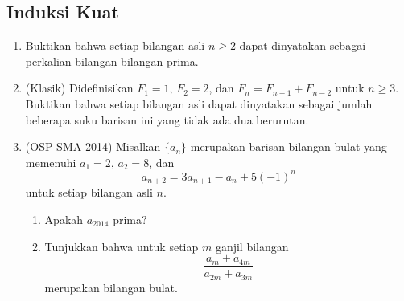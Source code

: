 \documentclass[12pt]{scrartcl}
\begin{document}
\subsection{Induksi Kuat}
\begin{enumerate}[resume]

	\item Buktikan bahwa setiap bilangan asli $n \ge 2$ dapat dinyatakan
	sebagai perkalian bilangan-bilangan prima.

	\item (Klasik)
	Didefinisikan $F_1 = 1$, $F_2 = 2$, dan $F_n = F_{n-1} + F_{n-2}$
	untuk $n \ge 3$.
	Buktikan bahwa setiap bilangan asli dapat dinyatakan sebagai jumlah
	beberapa suku barisan ini yang tidak ada dua berurutan.

	\item (OSP SMA 2014)
	Misalkan $\{a_n\}$ merupakan barisan bilangan bulat yang memenuhi
	$a_1 = 2$, $a_2 = 8$, dan
	\[ a_{n+2} = 3a_{n+1} - a_n + 5(-1)^n \]
	untuk setiap bilangan asli $n$.
	\begin{enumerate}
		\item Apakah $a_{2014}$ prima?
		\item Tunjukkan bahwa untuk setiap $m$ ganjil bilangan
		\[ \frac{a_m + a_{4m}}{a_{2m} + a_{3m}} \]
		merupakan bilangan bulat.
	\end{enumerate}

\end{enumerate}
\end{document}
